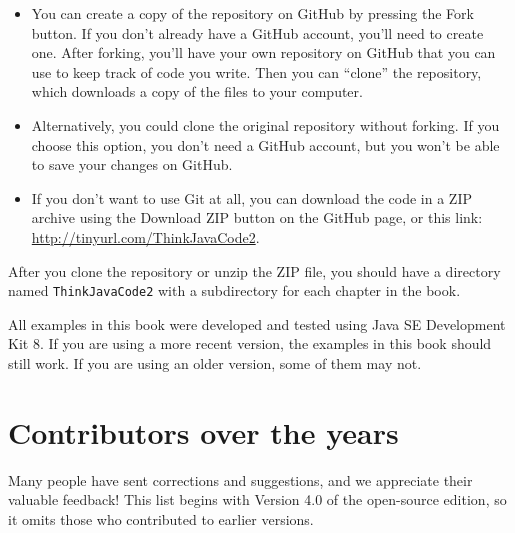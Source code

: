 \begin{itemize}

\item You can create a copy of the repository on GitHub by pressing the {\sf Fork} button.
If you don't already have a GitHub account, you'll need to create one.
After forking, you'll have your own repository on GitHub that you can use to keep track of code you write.
Then you can ``clone'' the repository, which downloads a copy of the files to your computer.

\item Alternatively, you could clone the original repository without forking.
If you choose this option, you don't need a GitHub account, but you won't be able to save your changes on GitHub.

\item If you don't want to use Git at all, you can download the code in a ZIP archive using the {\sf Download ZIP} button on the GitHub page, or this link: \url{http://tinyurl.com/ThinkJavaCode2}.

\end{itemize}

After you clone the repository or unzip the ZIP file, you should have a directory named {\tt ThinkJavaCode2} with a subdirectory for each chapter in the book.

All examples in this book were developed and tested using Java SE Development Kit 8.
If you are using a more recent version, the examples in this book should still work.
If you are using an older version, some of them may not.


\section*{Contributors over the years}

Many people have sent corrections and suggestions, and we appreciate their valuable feedback!
This list begins with Version 4.0 of the open-source edition, so it omits those who contributed to earlier versions.

